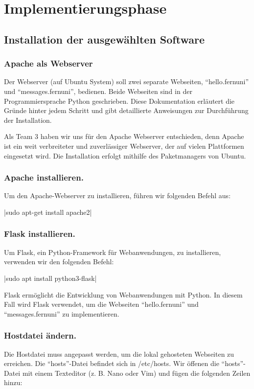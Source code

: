 \section{Implementierungsphase}

\subsection{Installation der ausgewählten Software}

\subsubsection{Apache als Webserver}

Der Webserver (auf Ubuntu System) soll zwei separate Webseiten, \enquote{hello.fernuni} und \enquote{messages.fernuni}, bedienen. Beide Webseiten sind in der Programmiersprache Python geschrieben. Diese Dokumentation erläutert die Gründe hinter jedem Schritt und gibt detaillierte Anweisungen zur Durchführung der Installation.

Als Team 3 haben wir uns für den Apache Webserver entschieden, denn Apache ist ein weit verbreiteter und zuverlässiger Webserver, der auf vielen Plattformen eingesetzt wird. Die Installation erfolgt mithilfe des Paketmanagers von Ubuntu.

\subsubsection*{Apache installieren.}
Um den Apache-Webserver zu installieren, führen wir folgenden Befehl aus:

|sudo apt-get install apache2|

\subsubsection*{Flask installieren.}
Um Flask, ein Python-Framework für Webanwendungen, zu installieren, verwenden wir den folgenden Befehl:

|sudo apt install python3-flask|

Flask ermöglicht die Entwicklung von Webanwendungen mit Python. In diesem Fall wird Flask verwendet, um die Webseiten \enquote{hello.fernuni} und \enquote{messages.fernuni} zu implementieren.

\subsubsection*{Hostdatei ändern.}
Die Hostdatei muss angepasst werden, um die lokal gehosteten Webseiten zu erreichen. Die \enquote{hosts}-Datei befindet sich in /etc/hosts. Wir öffenen die \enquote{hosts}-Datei mit einem Texteditor (z. B. Nano oder Vim) und fügen die folgenden Zeilen hinzu:

